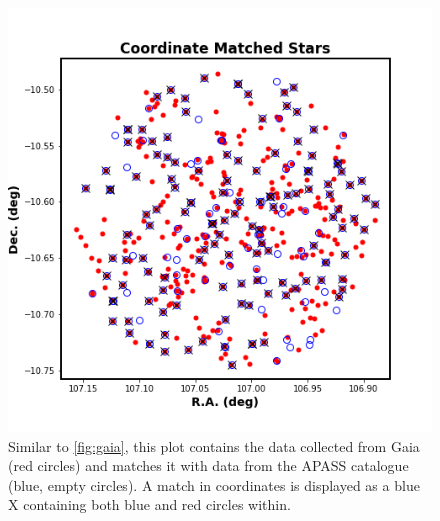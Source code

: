 \documentclass[linenumbers]{aastex631}
\begin{document}
\begin{figure}
    \centering
    \includegraphics[scale = 0.5]{pngs/coordinates_matched.png}
    \caption{\label{fig:match} Similar to \ref{fig:gaia}, this plot contains the data collected from Gaia (red circles) and matches it with data from the APASS catalogue (blue, empty circles). A match in coordinates is displayed as a blue X containing both blue and red circles within.}
    \label{fig:match}
\end{figure}
\end{document}
